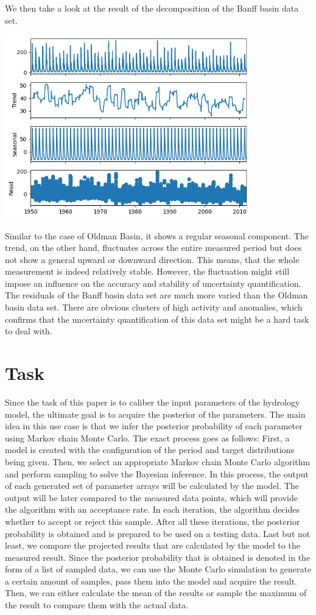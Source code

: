 We then take a look at the result of the decomposition of the Banff basin data set.
\begin{center}
\includegraphics[width=0.8\textwidth]{figures/dataset_time_series/Banff.png}
\end{center}
Similar to the case of Oldman Basin, it shows a regular seasonal component. The trend, on the other hand, fluctuates across the entire measured period but does not show a general upward or downward direction. This means, that the whole measurement is indeed relatively stable. However, the fluctuation might still impose an influence on the accuracy and stability of uncertainty quantification. The residuals of the Banff basin data set are much more varied than the Oldman basin data set. There are obvious clusters of high activity and anomalies, which confirms that the uncertainty quantification of this data set might be a hard task to deal with.


\section{Task}
Since the task of this paper is to caliber the input parameters of the hydrology model, the ultimate goal is to acquire the posterior of the parameters. The main idea in this use case is that we infer the posterior probability of each parameter using Markov chain Monte Carlo. The exact process goes as follows: First, a model is created with the configuration of the period and target distributions being given. Then, we select an appropriate Markov chain Monte Carlo algorithm and perform sampling to solve the Bayesian inference. In this process, the output of each generated set of parameter arrays will be calculated by the model. The output will be later compared to the measured data points, which will provide the algorithm with an acceptance rate. In each iteration, the algorithm decides whether to accept or reject this sample. After all these iterations, the posterior probability is obtained and is prepared to be used on a testing data. Last but not least, we compare the projected results that are calculated by the model to the measured result. Since the posterior probability that is obtained is denoted in the form of a list of sampled data, we can use the Monte Carlo simulation to generate a certain amount of samples, pass them into the model and acquire the result. Then, we can either calculate the mean of the results or sample the maximum of the result to compare them with the actual data.

